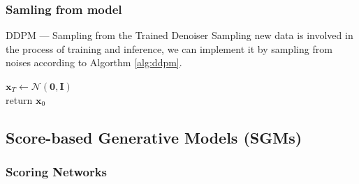\documentclass[10pt]{beamer}
\begin{document}
\subsubsection{Samling from model}

\begin{frame}{DDPM --- \normalsize Sampling from the Trained Denoiser}
    Sampling new data is involved in the process of training and inference,
    we can implement it by sampling from noises according to Algorthm \ref{alg:ddpm}.
    
    \bigskip
    
    \begin{algorithm}[H]
        \SetAlgoLined
        \BlankLine
        
        $\bm{x}_T \gets \mathcal{N}(\bm{0},\mathbf{I})$ \\
        return $\bm{x}_0$
        \caption{Sampling from DDPM model}
        \label{alg:ddpm}
    \end{algorithm}
\end{frame}


\subsection{Score-based Generative Models (SGMs)}

\subsubsection{Scoring Networks}
\end{document}
